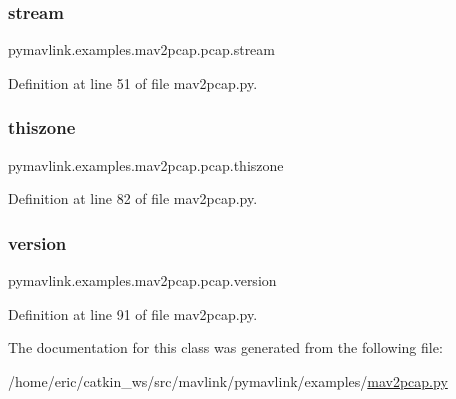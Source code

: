 \subsubsection{\texorpdfstring{stream}{stream}}
{\footnotesize\ttfamily pymavlink.\+examples.\+mav2pcap.\+pcap.\+stream}



Definition at line 51 of file mav2pcap.\+py.

\mbox{\label{classpymavlink_1_1examples_1_1mav2pcap_1_1pcap_a1c395139e6a08d237ca71d108b25488a}} 
\subsubsection{\texorpdfstring{thiszone}{thiszone}}
{\footnotesize\ttfamily pymavlink.\+examples.\+mav2pcap.\+pcap.\+thiszone}



Definition at line 82 of file mav2pcap.\+py.

\mbox{\label{classpymavlink_1_1examples_1_1mav2pcap_1_1pcap_a43f4774ba84bc5f07169f86764a53e0e}} 
\subsubsection{\texorpdfstring{version}{version}}
{\footnotesize\ttfamily pymavlink.\+examples.\+mav2pcap.\+pcap.\+version}



Definition at line 91 of file mav2pcap.\+py.



The documentation for this class was generated from the following file\+:\begin{DoxyCompactItemize}
\item 
/home/eric/catkin\+\_\+ws/src/mavlink/pymavlink/examples/\mbox{\hyperlink{mav2pcap_8py}{mav2pcap.\+py}}\end{DoxyCompactItemize}
